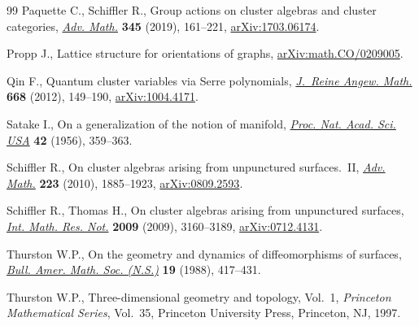 \documentclass[11pt]{article}
\numberwithin{equation}{section}
\begin{document}
\begin{thebibliography}{99}
Paquette C., Schiffler R., Group actions on cluster algebras and cluster
 categories, \href{https://doi.org/10.1016/j.aim.2019.01.009}{\textit{Adv. Math.}} \textbf{345} (2019), 161--221,
 \href{https://arxiv.org/abs/1703.06174}{arXiv:1703.06174}.

Propp J., Lattice structure for orientations of graphs,
 \href{https://arxiv.org/abs/math.CO/0209005}{arXiv:math.CO/0209005}.

Qin F., Quantum cluster variables via {S}erre polynomials, \href{https://doi.org/10.1515/crelle.2011.129}{\textit{J.~Reine
 Angew. Math.}} \textbf{668} (2012), 149--190, \href{https://arxiv.org/abs/1004.4171}{arXiv:1004.4171}.

Satake I., On a generalization of the notion of manifold, \href{https://doi.org/10.1073/pnas.42.6.359}{\textit{Proc. Nat.
 Acad. Sci. USA}} \textbf{42} (1956), 359--363.

Schiffler R., On cluster algebras arising from unpunctured surfaces.~{II},
 \href{https://doi.org/10.1016/j.aim.2009.10.015}{\textit{Adv. Math.}} \textbf{223} (2010), 1885--1923, \href{https://arxiv.org/abs/0809.2593}{arXiv:0809.2593}.

Schiffler R., Thomas H., On cluster algebras arising from unpunctured surfaces,
 \href{https://doi.org/10.1093/imrn/rnp047}{\textit{Int. Math. Res. Not.}} \textbf{2009} (2009), 3160--3189,
 \href{https://arxiv.org/abs/0712.4131}{arXiv:0712.4131}.

Thurston W.P., On the geometry and dynamics of diffeomorphisms of surfaces,
 \href{https://doi.org/10.1090/S0273-0979-1988-15685-6}{\textit{Bull. Amer. Math. Soc. (N.S.)}} \textbf{19} (1988), 417--431.

Thurston W.P., Three-dimensional geometry and topology, {V}ol.~1,
 \textit{Princeton Mathematical Series}, Vol.~35, Princeton University Press,
 Princeton, NJ, 1997.

\end{thebibliography}
\end{document}
